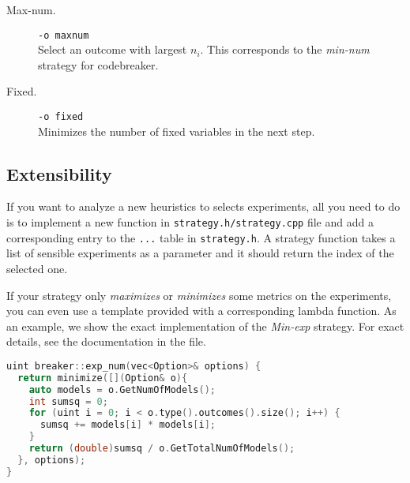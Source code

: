 \begin{description}
\item[Max-num.] \texttt{-o maxnum} \\
  Select an outcome with largest $n_i$. This
  corresponds to the \emph{min-num} strategy for codebreaker.
\item[Fixed.] \texttt{-o fixed} \\
  Minimizes the number of fixed variables in the next step.
\end{description}

\subsection{Extensibility}

If you want to analyze a new heuristics to selects experiments,
  all you need to do is to implement a new function
  in \texttt{strategy.h/strategy.cpp} file and add a corresponding entry
  to the \texttt{...} table in \texttt{strategy.h}.
A strategy function takes a list of sensible experiments as a parameter
  and it should return the index of the selected one.

If your strategy only \emph{maximizes} or \emph{minimizes}
  some metrics on the experiments,
  you can even use a template provided with a corresponding lambda function.
As an example, we show the exact implementation of the \emph{Min-exp} strategy.
For exact details, see the documentation in the file.

\begin{lstlisting}[language=C++]
uint breaker::exp_num(vec<Option>& options) {
  return minimize([](Option& o){
    auto models = o.GetNumOfModels();
    int sumsq = 0;
    for (uint i = 0; i < o.type().outcomes().size(); i++) {
      sumsq += models[i] * models[i];
    }
    return (double)sumsq / o.GetTotalNumOfModels();
  }, options);
}
\end{lstlisting}

